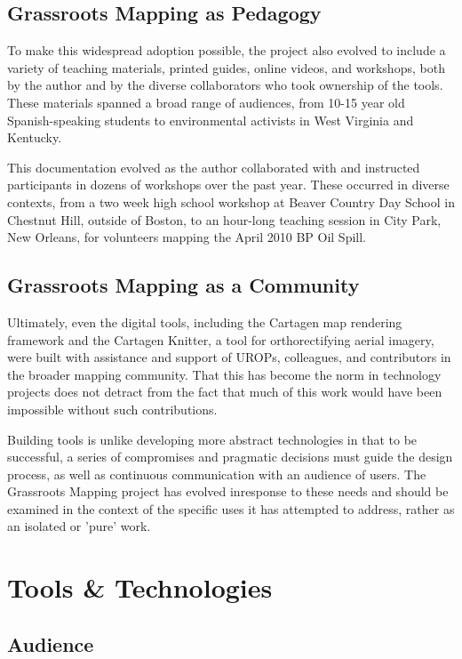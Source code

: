 \documentclass[11pt]{report}
\begin{document}
\subsection{Grassroots Mapping as Pedagogy}

To make this widespread adoption possible, the project also evolved to include a variety of teaching materials, printed guides, online videos, and workshops, both by the author and by the diverse collaborators who took ownership of the tools. These materials spanned a broad range of audiences, from 10-15 year old Spanish-speaking students to environmental activists in West Virginia and Kentucky. 

This documentation evolved as the author collaborated with and instructed participants in dozens of workshops over the past year. These occurred in diverse contexts, from a two week high school workshop at Beaver Country Day School in Chestnut Hill, outside of Boston, to an hour-long teaching session in City Park, New Orleans, for volunteers mapping the April 2010 BP Oil Spill. 

\subsection{Grassroots Mapping as a Community}

Ultimately, even the digital tools, including the Cartagen map rendering framework and the Cartagen Knitter, a tool for orthorectifying aerial imagery, were built with assistance and support of UROPs, colleagues, and contributors in the broader mapping community. That this has become the norm in technology projects does not detract from the fact that much of this work would have been impossible without such contributions. 

Building tools is unlike developing more abstract technologies in that to be successful, a series of compromises and pragmatic decisions must guide the design process, as well as continuous communication with an audience of users. The Grassroots Mapping project has evolved inresponse to these needs and should be examined in the context of the specific uses it has attempted to address, rather as an isolated or 'pure' work.

\section{Tools \& Technologies}

\subsection{Audience}
\end{document}
